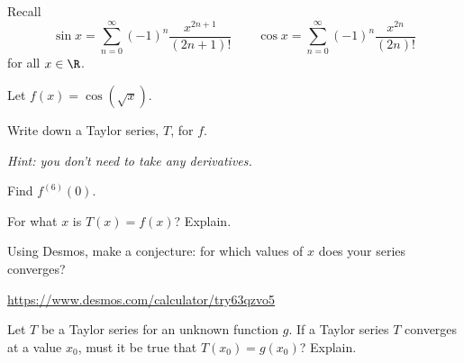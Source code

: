 \documentclass{workbook}
\begin{document}
\begin{slide}
	\question
	Recall 
	\[
		\sin x = \sum_{n=0}^\infty (-1)^n\frac{x^{2n+1}}{(2n+1)!}
		\qquad
		\cos x = \sum_{n=0}^\infty (-1)^n\frac{x^{2n}}{(2n)!}
	\]
	for all $x\in\R$.

	Let $f(x)=\cos(\sqrt{x})$.

	\begin{parts}
		\item Write down a Taylor series, $T$, for $f$.

		\emph{Hint: you don't need to take any derivatives.}

		\item Find $f^{(6)}(0)$.
		
		\item For what $x$ is $T(x)=f(x)$? Explain.

		\item Using Desmos, make a conjecture: for which values of $x$ does your series converges?

		{\small\url{https://www.desmos.com/calculator/try63qzvo5}}

		\item Let $T$ be a Taylor series for an unknown function $g$.
		If a Taylor series $T$ converges at a value $x_0$, must it be true that $T(x_0)=g(x_0)$?
		Explain. 

	\end{parts}
\end{slide}
\end{document}
